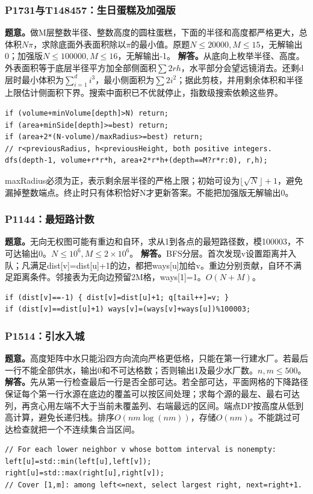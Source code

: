 \subsubsection{P1731与T148457：生日蛋糕及加强版}
\textbf{题意。}做M层整数半径、整数高度的圆柱蛋糕，下面的半径和高度都严格更大，总体积$N\pi$，求除底面外表面积除以$\pi$的最小值。原题$N\le20000,M\le15$，无解输出0；加强版$N\le100000,M\le16$，无解输出-1。
\textbf{解答。}从底向上枚举半径、高度。外表面积等于底层半径平方加全部侧面积$\sum2rh$，水平部分会望远镜消去。还剩d层时最小体积为$\sum_{i=1}^d i^3$，最小侧面积为$\sum2i^2$；据此剪枝，并用剩余体积和半径上限估计侧面积下界。搜索中面积已不优就停止，指数级搜索依赖这些界。
\begin{lstlisting}
if (volume+minVolume[depth]>N) return;
if (area+minSide[depth]>=best) return;
if (area+2*(N-volume)/maxRadius>=best) return;
// r<previousRadius, h<previousHeight, both positive integers.
dfs(depth-1, volume+r*r*h, area+2*r*h+(depth==M?r*r:0), r,h);
\end{lstlisting}
maxRadius必须为正，表示剩余层半径的严格上限；初始可设为$\lfloor\sqrt N\rfloor+1$，避免漏掉整数端点。终止时只有体积恰好N才更新答案。不能把加强版无解输出0。

\subsubsection{P1144：最短路计数}
\textbf{题意。}无向无权图可能有重边和自环，求从1到各点的最短路径数，模100003，不可达输出0。$N\le10^6,M\le2\times10^6$。
\textbf{解答。}BFS分层。首次发现v设置距离并入队；凡满足dist[v]=dist[u]+1的边，都把ways[u]加给v。重边分别贡献，自环不满足距离条件。邻接表为无向边预留2M格，ways[1]=1。$O(N+M)$。
\begin{lstlisting}
if (dist[v]==-1) { dist[v]=dist[u]+1; q[tail++]=v; }
if (dist[v]==dist[u]+1) ways[v]=(ways[v]+ways[u])%100003;
\end{lstlisting}

\subsubsection{P1514：引水入城}
\textbf{题意。}高度矩阵中水只能沿四方向流向严格更低格，只能在第一行建水厂。若最后一行不能全部供水，输出0和不可达格数；否则输出1及最少水厂数。$n,m\le500$。
\textbf{解答。}先从第一行检查最后一行是否全部可达。若全部可达，平面网格的下降路径保证每个第一行水源在底边的覆盖可以按区间处理；求每个源的最左、最右可达列，再贪心用左端不大于当前未覆盖列、右端最远的区间。端点DP按高度从低到高计算，避免长递归栈。排序$O(nm\log(nm))$，存储$O(nm)$。不能跳过可达检查就把一个不连续集合当区间。
\begin{lstlisting}
// For each lower neighbor v whose bottom interval is nonempty:
left[u]=std::min(left[u],left[v]);
right[u]=std::max(right[u],right[v]);
// Cover [1,m]: among left<=next, select largest right, next=right+1.
\end{lstlisting}

